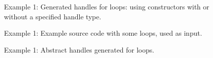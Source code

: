 \begin{figure}[!h]
{\indent
{\mySmallFontSize
\begin{latexonly}
  
\end{latexonly}

\begin{htmlonly}
   
\end{htmlonly}

}
}
\caption{Example 1: Generated handles for loops: using constructors with or without a specified handle type.}
\label{Tutorial:abstractHandle1}
\end{figure}
\begin{figure}[!h]
{\indent
{\mySmallFontSize
\begin{latexonly}
  
\end{latexonly}

\begin{htmlonly}
   
\end{htmlonly}

}
}
\caption{Example 1: Example source code with some loops, used as input.}
\label{Tutorial:abstractHandle1input}
\end{figure}


\begin{figure}[!h]
{\indent
{\mySmallFontSize
\begin{latexonly}
  
\end{latexonly}

\begin{htmlonly}
   
\end{htmlonly}

}
}
\caption{Example 1: Abstract handles generated for loops.}
\label{Tutorial:abstractHandle1out}
\end{figure}

